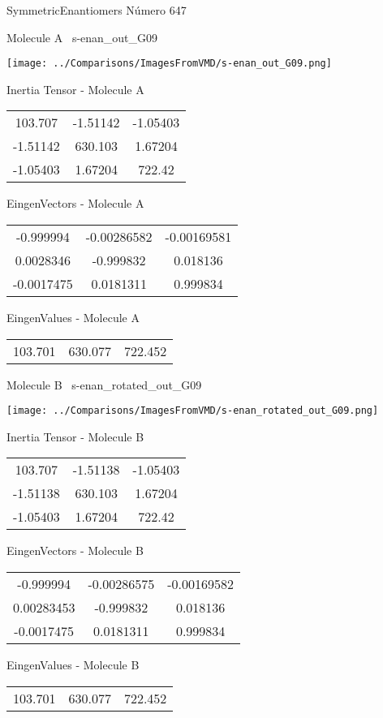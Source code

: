 \vtab[-3cm]
\begin{center}
{\large SymmetricEnantiomers \tab Número 647}
\end{center}
\begin{multicols}{2}
\begin{center}

Molecule A \
s-enan\_out\_G09

\texttt{[image: ../Comparisons/ImagesFromVMD/s-enan\_out\_G09.png]}

Inertia Tensor - Molecule A \\
\begin{tabular}{|c c c|}
103.707	 & 	-1.51142	 & 	-1.05403	 \\
-1.51142	 & 	630.103	 & 	1.67204	 \\
-1.05403	 & 	1.67204	 & 	722.42
\end{tabular}

\vtab
 EingenVectors - Molecule A     \\
\begin{tabular}{|c c c|}
-0.999994	 & 	-0.00286582	 & 	-0.00169581	 \\
0.0028346	 & 	-0.999832	 & 	0.018136	 \\
-0.0017475	 & 	0.0181311	 & 	0.999834
\end{tabular}

\vtab
 EingenValues - Molecule A     \\
\begin{tabular}{|c c c|}
103.701	 & 	630.077	 & 	722.452	 \\
\end{tabular}
\columnbreak

Molecule B \
s-enan\_rotated\_out\_G09

\texttt{[image: ../Comparisons/ImagesFromVMD/s-enan\_rotated\_out\_G09.png]}

Inertia Tensor - Molecule B \\
\begin{tabular}{|c c c|}
103.707	 & 	-1.51138	 & 	-1.05403	 \\
-1.51138	 & 	630.103	 & 	1.67204	 \\
-1.05403	 & 	1.67204	 & 	722.42
\end{tabular}

\vtab
 EingenVectors - Molecule B     \\
\begin{tabular}{|c c c|}
-0.999994	 & 	-0.00286575	 & 	-0.00169582	 \\
0.00283453	 & 	-0.999832	 & 	0.018136	 \\
-0.0017475	 & 	0.0181311	 & 	0.999834
\end{tabular}

\vtab
 EingenValues - Molecule B     \\
\begin{tabular}{|c c c|}
103.701	 & 	630.077	 & 	722.452	 \\
\end{tabular}

\end{center}
\end{multicols}

